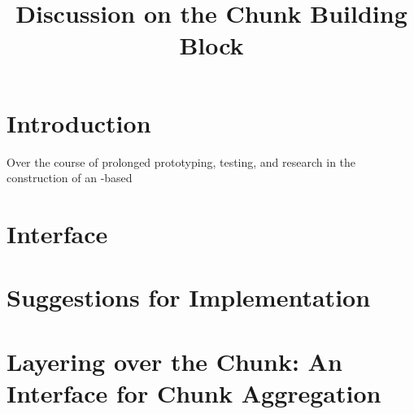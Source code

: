 \documentclass[10pt, a4paper]{article}
\begin{document}
\title{Discussion on the Chunk Building Block}
  
\maketitle

\section{Introduction} %

Over the course of prolonged prototyping, testing, and research in the construction of an \R{}-based 

\section{Interface}
\section{Suggestions for Implementation}
\section{Layering over the Chunk: An Interface for Chunk Aggregation}

\end{document}
